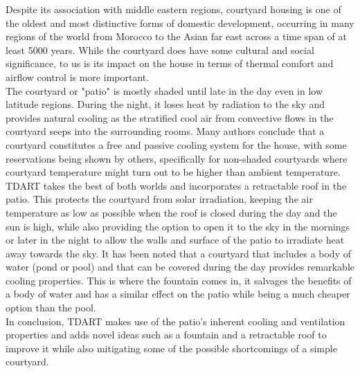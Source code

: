 \documentclass{tufte-book}
\begin{document}
	
	Despite its association with middle eastern regions, courtyard housing is one of the oldest and most distinctive forms of domestic development, occurring in many regions of the world from Morocco to the Asian far east across a time span of at least 5000 years\cite{edwards2006courtyard}. While the courtyard does have some cultural and social significance, to us is its impact on the house in terms of thermal comfort and airflow control is more important.\\
	The courtyard or "patio" is mostly shaded until late in the day even in low latitude regions. During the night, it loses heat by radiation to the sky\cite{batty1991natural} and provides natural cooling as the stratified cool air from convective flows in the courtyard seeps into the surrounding rooms. Many authors\cite{scudo1988climatic,fathy1986natural} conclude that a courtyard constitutes a free and passive cooling system for the house, with some reservations being shown by others\cite{etzion1990thermal}, specifically for non-shaded courtyards where courtyard temperature might turn out to be higher than ambient temperature. TDART takes the best of both worlds and incorporates a retractable roof in the patio. This protects the courtyard from solar irradiation, keeping the air temperature as low as possible when the roof is closed during the day and the sun is high, while also providing the option to open it to the sky in the mornings or later in the night to allow the walls and surface of the patio to irradiate heat away towards the sky. It has been noted that a courtyard that includes a body of water (pond or pool) and that can be covered during the day provides remarkable cooling properties\cite{al2001effect}. This is where the fountain comes in, it salvages the benefits of a body of water and has a similar effect on the patio while being a much cheaper option than the pool.\\
	In conclusion, TDART makes use of the patio's inherent cooling and ventilation properties and adds novel ideas such as a fountain and a retractable roof to improve it while also mitigating some of the possible shortcomings of a simple courtyard.
	
\end{document}
